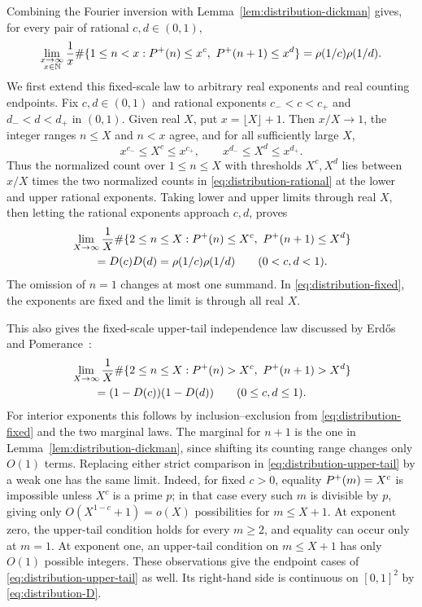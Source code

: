 Combining the Fourier inversion with Lemma~\ref{lem:distribution-dickman}
gives, for every pair of rational $c,d\in(0,1)$,
\begin{equation}
 \lim_{\substack{x\to\infty\\x\in\mathbb N}}\frac1x
 \#\{1\le n<x:P^+(n)\le x^c,\
                     P^+(n+1)\le x^d\}
     =\rho(1/c)\rho(1/d).
 \label{eq:distribution-rational}
\end{equation}
We first extend this fixed-scale law to arbitrary real exponents and
real counting endpoints.  Fix $c,d\in(0,1)$ and rational exponents
$c_-<c<c_+$ and $d_-<d<d_+$ in $(0,1)$.  Given real $X$, put
$x=\lfloor X\rfloor+1$.  Then $x/X\to1$, the integer ranges
$n\le X$ and $n<x$ agree, and for all sufficiently large $X$,
\[
 x^{c_-}\le X^c\le x^{c_+},\qquad
 x^{d_-}\le X^d\le x^{d_+}.
\]
Thus the normalized count over $1\le n\le X$ with thresholds $X^c,X^d$
lies between $x/X$ times the two normalized counts in
\eqref{eq:distribution-rational} at the lower and upper rational
exponents.  Taking lower and upper limits through real $X$, then
letting the rational exponents approach $c,d$, proves
\begin{equation}
 \begin{split}
 &\lim_{X\to\infty}\frac1X
 \#\{2\le n\le X:P^+(n)\le X^c,\ P^+(n+1)\le X^d\}\\
 &\qquad=D(c)D(d)=\rho(1/c)\rho(1/d)
 \qquad(0<c,d<1).
 \end{split}
 \label{eq:distribution-fixed}
\end{equation}
The omission of $n=1$ changes at most one summand.  In
\eqref{eq:distribution-fixed}, the exponents are fixed and the limit
is through all real $X$.

This also gives the fixed-scale upper-tail independence law discussed
by Erd\H{o}s and Pomerance~\cite[p.~311]{ErdosPomerance1978}:
\begin{equation}
 \begin{split}
 &\lim_{X\to\infty}\frac1X
 \#\{2\le n\le X:P^+(n)>X^c,\ P^+(n+1)>X^d\}\\
 &\qquad=(1-D(c))(1-D(d))
 \qquad(0\le c,d\le1).
 \end{split}
 \label{eq:distribution-upper-tail}
\end{equation}
For interior exponents this follows by inclusion--exclusion from
\eqref{eq:distribution-fixed} and the two marginal laws.  The marginal
for $n+1$ is the one in Lemma~\ref{lem:distribution-dickman}, since
shifting its counting range changes only $O(1)$ terms.  Replacing either
strict comparison in \eqref{eq:distribution-upper-tail} by a weak one
has the same limit.  Indeed, for fixed $c>0$, equality
$P^+(m)=X^c$ is impossible unless $X^c$ is a prime $p$; in that
case every such $m$ is divisible by $p$, giving only
$O(X^{1-c}+1)=o(X)$ possibilities for $m\le X+1$.  At exponent zero,
the upper-tail condition holds for every $m\ge2$, and equality can
occur only at $m=1$.  At exponent one, an upper-tail condition on
$m\le X+1$ has only $O(1)$ possible integers.  These observations
give the endpoint cases of \eqref{eq:distribution-upper-tail} as well.
Its right-hand side is continuous on $[0,1]^2$ by
\eqref{eq:distribution-D}.

